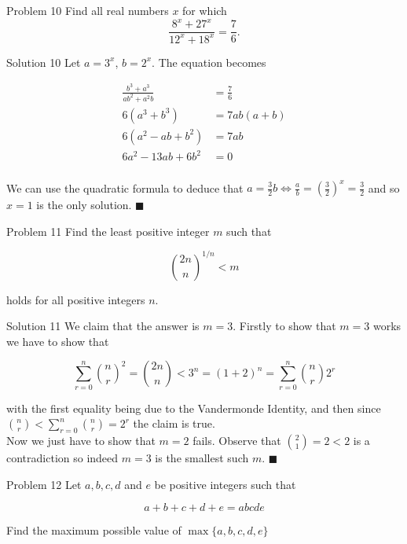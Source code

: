 \documentclass{article}
\begin{document}
\begin{problem}{Problem 10}
Find all real numbers \( x \) for which
\[
\frac{8^x + 27^x}{12^x + 18^x} = \frac{7}{6}.
\]
\end{problem}

\begin{solution}{Solution 10}
Let $a=3^x$, $b=2^x$. The equation becomes

\[
\begin{aligned}
\frac{b^3 + a^3}{ab^2 + a^2 b} &= \frac{7}{6}\\
6(a^3 + b^3) &= 7ab(a+b)\\
6(a^2 - ab + b^2) &= 7ab\\
6a^2 - 13ab + 6b^2 &= 0\\
\end{aligned}
\]

We can use the quadratic formula to deduce that $a = \frac{3}{2} b \iff
\frac{a}{b} = \left( \frac{3}{2} \right)^x = \frac{3}{2}$ and so $x=1$ is
the only solution. $\blacksquare$
\end{solution}

\vspace{0.2cm}

\begin{problem}{Problem 11}
Find the least positive integer $m$ such that

$$
\binom{2n}{n}^{1/n} < m
$$

holds for all positive integers $n$.
\end{problem}

\begin{solution}{Solution 11}
We claim that the answer is $m=3$. Firstly to show that $m=3$ works we
have to show that

$$
\sum_{r=0}^n \binom{n}{r}^2 = \binom{2n}{n} < 3^n = (1+2)^n = \sum_{r=0}^n \binom{n}{r} 2^r
$$

with the first equality being due to the Vandermonde Identity, and then
since
$\binom{n}{r} < \sum_{r=0}^n \binom{n}{r} = 2^r$ the claim is true. \\

Now we just have to show that $m=2$ fails. Observe that
$\binom{2}{1} = 2 < 2$ is a contradiction so indeed $m=3$ is the smallest
such $m$. $\blacksquare$
\end{solution}
\vspace{0.2cm}

\begin{problem}{Problem 12}
Let $a,b,c,d$ and $e$ be positive integers such that

$$
a+b+c+d+e = abcde
$$

Find the maximum possible value of $\max \{ a,b,c,d,e \}$
\end{problem}
\end{document}
